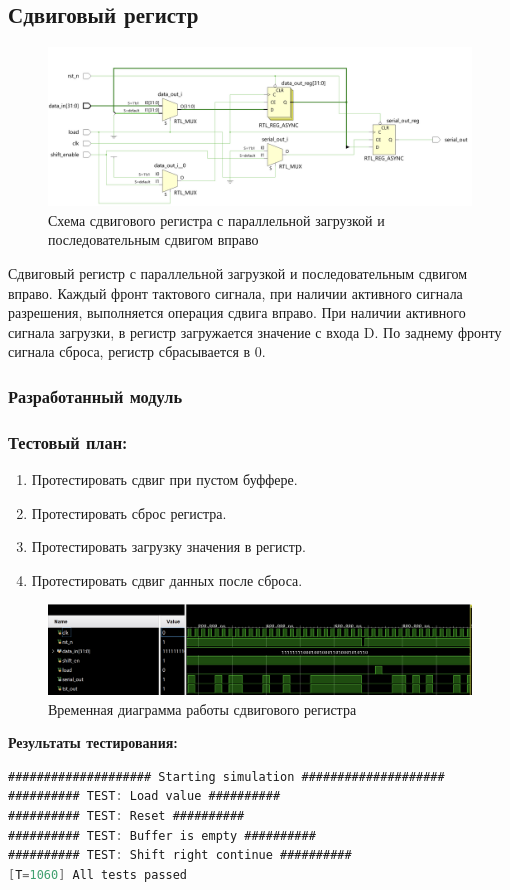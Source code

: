 \documentclass[12pt,onecolumn]{article}
\begin{document}
\subsection{Сдвиговый регистр}
\begin{figure}[H]
  \centering
  \includegraphics[width=\textwidth]{image/shift-right.png}
  \caption{Схема сдвигового регистра с параллельной загрузкой и последовательным сдвигом вправо}
\end{figure}
Сдвиговый регистр с параллельной загрузкой и последовательным сдвигом вправо.
Каждый фронт тактового сигнала, при наличии активного сигнала разрешения, выполняется операция сдвига вправо.
При наличии активного сигнала загрузки, в регистр загружается значение с входа D.
По заднему фронту сигнала сброса, регистр сбрасывается в 0.
\subsubsection{Разработанный модуль}

\subsubsection{Тестовый план:}
\begin{enumerate}
  \item Протестировать сдвиг при пустом буффере.
  \item Протестировать сброс регистра.
  \item Протестировать загрузку значения в регистр.
  \item Протестировать сдвиг данных после сброса.
\end{enumerate}
\begin{figure}[H]
  \centering
  \includegraphics[width=\textwidth]{image/shift-right-diagram.png}
  \caption{Временная диаграмма работы сдвигового регистра}
\end{figure}

\textbf{Результаты тестирования:}
\begin{lstlisting}[language=verilog]
#################### Starting simulation ####################
########## TEST: Load value ##########
########## TEST: Reset ##########
########## TEST: Buffer is empty ##########
########## TEST: Shift right continue ##########
[T=1060] All tests passed
\end{lstlisting}
 
\end{document}
